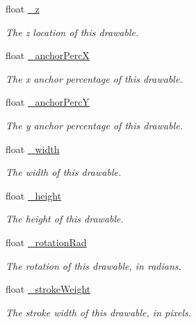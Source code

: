 \begin{DoxyCompactItemize}
float \hyperlink{classhype_1_1core_1_1drawable_1_1_h_drawable_ad66aec98221c2988eda1ffb4310ca72a}{\-\_\-z}
\begin{DoxyCompactList}\small\item\em The z location of this drawable. \end{DoxyCompactList}\item 
float \hyperlink{classhype_1_1core_1_1drawable_1_1_h_drawable_aafd5ea67637b380c4b81ad3e093e8c40}{\-\_\-anchor\-Perc\-X}
\begin{DoxyCompactList}\small\item\em The x anchor percentage of this drawable. \end{DoxyCompactList}\item 
float \hyperlink{classhype_1_1core_1_1drawable_1_1_h_drawable_a14172ed41bc22c209a9a7aae34a8d835}{\-\_\-anchor\-Perc\-Y}
\begin{DoxyCompactList}\small\item\em The y anchor percentage of this drawable. \end{DoxyCompactList}\item 
float \hyperlink{classhype_1_1core_1_1drawable_1_1_h_drawable_a1a040597d04986d5378b477453d987e4}{\-\_\-width}
\begin{DoxyCompactList}\small\item\em The width of this drawable. \end{DoxyCompactList}\item 
float \hyperlink{classhype_1_1core_1_1drawable_1_1_h_drawable_ac4171079b3f6831d4f982ad2ae6363ce}{\-\_\-height}
\begin{DoxyCompactList}\small\item\em The height of this drawable. \end{DoxyCompactList}\item 
float \hyperlink{classhype_1_1core_1_1drawable_1_1_h_drawable_a5489140987809e738b74139cfa0e7583}{\-\_\-rotation\-Rad}
\begin{DoxyCompactList}\small\item\em The rotation of this drawable, in radians. \end{DoxyCompactList}\item 
float \hyperlink{classhype_1_1core_1_1drawable_1_1_h_drawable_ae27cfc0ffd6a6c5e8d44a1b7f017f157}{\-\_\-stroke\-Weight}
\begin{DoxyCompactList}\small\item\em The stroke width of this drawable, in pixels. \end{DoxyCompactList}\item 

\end{DoxyCompactItemize}
